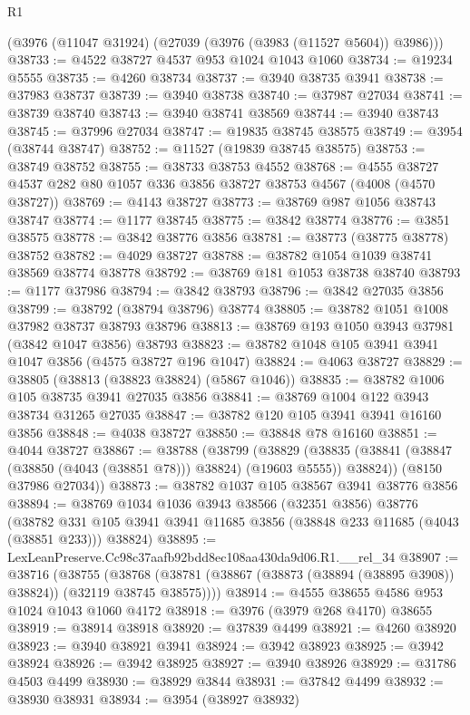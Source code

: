 \begin{lexlean}{R1}
\begin{coremodule}
    (@3976 (@11047 @31924) (@27039 (@3976 (@3983 (@11527 @5604)) @3986)))
@38733 := @4522 @38727 @4537 @953 @1024 @1043 @1060
@38734 := @19234 @5555
@38735 := @4260 @38734
@38737 := @3940 @38735 @3941
@38738 := @37983 @38737
@38739 := @3940 @38738
@38740 := @37987 @27034
@38741 := @38739 @38740
@38743 := @3940 @38741 @38569
@38744 := @3940 @38743
@38745 := @37996 @27034
@38747 := @19835 @38745 @38575
@38749 := @3954 (@38744 @38747)
@38752 := @11527 (@19839 @38745 @38575)
@38753 := @38749 @38752
@38755 := @38733 @38753 @4552
@38768 := @4555 @38727 @4537 @282 @80 @1057 @336 @3856 @38727 @38753 @4567 (@4008 (@4570 @38727))
@38769 := @4143 @38727
@38773 := @38769 @987 @1056 @38743 @38747
@38774 := @1177 @38745
@38775 := @3842 @38774
@38776 := @3851 @38575
@38778 := @3842 @38776 @3856
@38781 := @38773 (@38775 @38778) @38752
@38782 := @4029 @38727
@38788 := @38782 @1054 @1039 @38741 @38569 @38774 @38778
@38792 := @38769 @181 @1053 @38738 @38740
@38793 := @1177 @37986
@38794 := @3842 @38793
@38796 := @3842 @27035 @3856
@38799 := @38792 (@38794 @38796) @38774
@38805 := @38782 @1051 @1008 @37982 @38737 @38793 @38796
@38813 := @38769 @193 @1050 @3943 @37981 (@3842 @1047 @3856) @38793
@38823 := @38782 @1048 @105 @3941 @3941 @1047 @3856 (@4575 @38727 @196 @1047)
@38824 := @4063 @38727
@38829 := @38805 (@38813 (@38823 @38824) (@5867 @1046))
@38835 := @38782 @1006 @105 @38735 @3941 @27035 @3856
@38841 := @38769 @1004 @122 @3943 @38734 @31265 @27035
@38847 := @38782 @120 @105 @3941 @3941 @16160 @3856
@38848 := @4038 @38727
@38850 := @38848 @78 @16160
@38851 := @4044 @38727
@38867 := @38788
    (@38799
      (@38829 (@38835 (@38841 (@38847 (@38850 (@4043 (@38851 @78))) @38824) (@19603 @5555)) @38824))
      (@8150 @37986 @27034))
@38873 := @38782 @1037 @105 @38567 @3941 @38776 @3856
@38894 := @38769
    @1034
    @1036
    @3943
    @38566
    (@32351 @3856)
    @38776
    (@38782 @331 @105 @3941 @3941 @11685 @3856 (@38848 @233 @11685 (@4043 (@38851 @233))) @38824)
@38895 := LexLeanPreserve.Cc98c37aafb92bdd8ec108aa430da9d06.R1.__rel_34
@38907 := @38716
    (@38755
      (@38768 (@38781 (@38867 (@38873 (@38894 (@38895 @3908)) @38824)) (@32119 @38745 @38575))))
@38914 := @4555 @38655 @4586 @953 @1024 @1043 @1060 @4172
@38918 := @3976 (@3979 @268 @4170) @38655
@38919 := @38914 @38918
@38920 := @37839 @4499
@38921 := @4260 @38920
@38923 := @3940 @38921 @3941
@38924 := @3942 @38923
@38925 := @3942 @38924
@38926 := @3942 @38925
@38927 := @3940 @38926
@38929 := @31786 @4503 @4499
@38930 := @38929 @3844
@38931 := @37842 @4499
@38932 := @38930 @38931
@38934 := @3954 (@38927 @38932)

\end{coremodule}
\end{lexlean}
